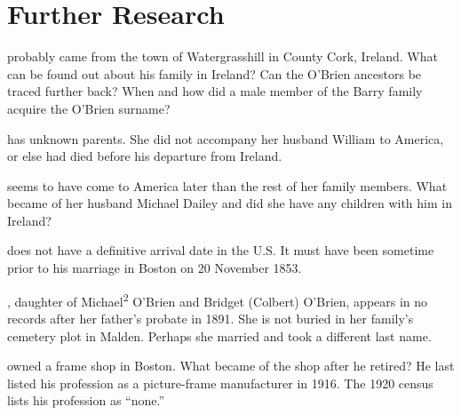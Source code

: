 \chapter{Further Research}

 probably came from the town of Watergrasshill in County Cork, Ireland. What can be found out about his family in Ireland? Can the O'Brien ancestors be traced further back? When and how did a male member of the Barry family acquire the O'Brien surname?

 has unknown parents. She did not accompany her husband William to America, or else had died before his departure from Ireland. 

 seems to have come to America later than the rest of her family members. What became of her husband Michael Dailey and did she have any children with him in Ireland?

 does not have a definitive arrival date in the U.S. It must have been sometime prior to his marriage in Boston on 20 November 1853.

, daughter of Michael\textsuperscript{2} O'Brien and Bridget (Colbert) O'Brien, appears in no records after her father's probate in 1891. She is not buried in her family's cemetery plot in Malden. Perhaps she married and took a different last name.

 owned a frame shop in Boston. What became of the shop after he retired? He last listed his profession as a picture-frame manufacturer in 1916. The 1920 census lists his profession as ``none.''\cite{John3OBrien1916:4}